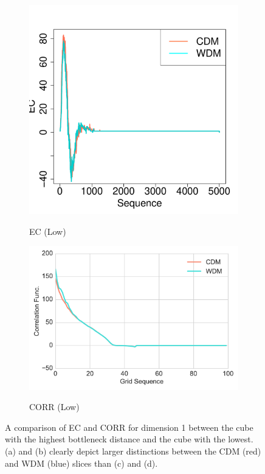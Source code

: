 \documentclass[12pt]{article}
\begin{document}
\begin{figure}[htp!]
\begin{subfigure}{0.24\textwidth}
    \label{fig:valid2}
  \end{subfigure}
    \begin{subfigure}{0.21\textwidth}
    \centering
        \caption{EC (Low)}
\includegraphics[width=\linewidth]{figure_13_min_margin_2euler.pdf}
    \label{fig:valid3}
  \end{subfigure}
    \begin{subfigure}{0.24\textwidth}
    \centering
        \caption{CORR (Low)}
\includegraphics[width=\linewidth]{figure_13_min_margin_corr.pdf}
    \label{fig:valid4}
  \end{subfigure}
    \caption{A comparison of EC and CORR for dimension 1 between the cube with the highest bottleneck distance and the cube with the lowest. (a) and (b) clearly depict larger distinctions between the CDM (red) and WDM (blue) slices than (c) and (d).}
    \label{fig:validationfigs}
\end{figure}
\end{document}
